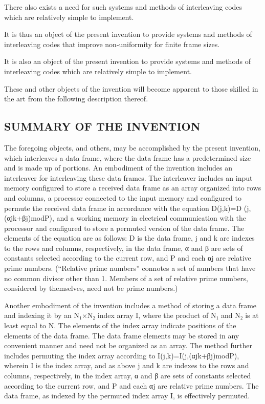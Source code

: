 \documentclass[11pt,a4paper]{article}
\begin{document}
There also exists a need for such systems and methods of interleaving codes which are relatively simple to implement.

It is thus an object of the present invention to provide systems and methods of interleaving codes that improve non-uniformity for finite frame sizes.

It is also an object of the present invention to provide systems and methods of interleaving codes which are relatively simple to implement.

These and other objects of the invention will become apparent to those skilled in the art from the following description thereof.

\subsection{SUMMARY OF THE INVENTION}

The foregoing objects, and others, may be accomplished by the present invention, which interleaves a data frame, where the data frame has a predetermined size and is made up of portions. An embodiment of the invention includes an interleaver for interleaving these data frames. The interleaver includes an input memory configured to store a received data frame as an array organized into rows and columns, a processor connected to the input memory and configured to permute the received data frame in accordance with the equation D(j,k)=D (j, (αjk+βj)modP), and a working memory in electrical communication with the processor and configured to store a permuted version of the data frame. The elements of the equation are as follows: D is the data frame, j and k are indexes to the rows and columns, respectively, in the data frame, α and β are sets of constants selected according to the current row, and P and each αj are relative prime numbers. (“Relative prime numbers” connotes a set of numbers that have no common divisor other than 1. Members of a set of relative prime numbers, considered by themselves, need not be prime numbers.)

Another embodiment of the invention includes a method of storing a data frame and indexing it by an N₁×N₂ index array I, where the product of N₁ and N₂ is at least equal to N. The elements of the index array indicate positions of the elements of the data frame. The data frame elements may be stored in any convenient manner and need not be organized as an array. The method further includes permuting the index array according to I(j,k)=I(j,(αjk+βj)modP), wherein I is the index array, and as above j and k are indexes to the rows and columns, respectively, in the index array, α and β are sets of constants selected according to the current row, and P and each αj are relative prime numbers. The data frame, as indexed by the permuted index array I, is effectively permuted.
\end{document}
